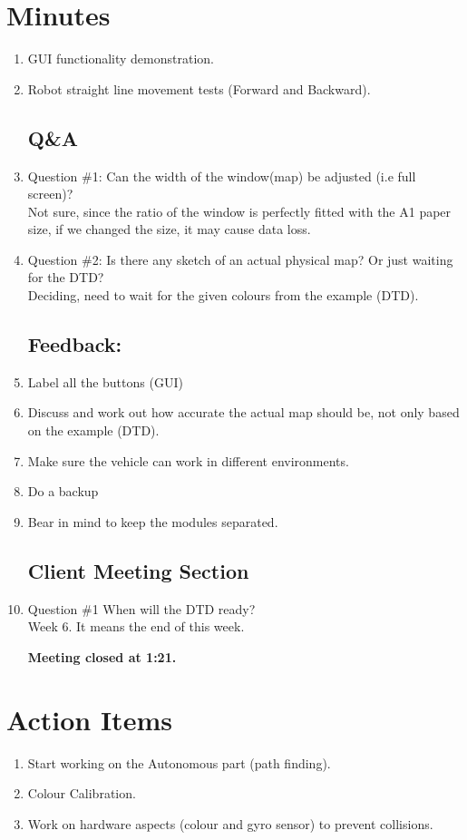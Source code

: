 \documentclass{article}
\begin{document}
\section{Minutes}
\begin{enumerate}
\subsection{GUI Prototype and Basic Movement Presentation}
\item GUI functionality demonstration.\\
\item Robot straight line movement tests (Forward and Backward).\\

\subsection{Q\&A}
\item Question \#1: Can the width of the window(map) be adjusted (i.e full screen)?
\\                  Not sure, since the ratio of the window is perfectly fitted with the A1 paper size, if we changed the size, it may cause data loss.
\item Question \#2: Is there any sketch of an actual physical map? Or just waiting for the DTD?
\\					Deciding, need to wait for the given colours from the example (DTD).

\subsection{Feedback:}

\item Label all the buttons (GUI)
\item Discuss and work out how accurate the actual map should be, not only based on the example (DTD).
\item Make sure the vehicle can work in different environments.
\item Do a backup
\item Bear in mind to keep the modules separated.


\subsection{Client Meeting Section}

\item Question \#1 When will the DTD ready?
\\					Week 6. It means the end of this week.



\vspace{.5cm}
\textbf{Meeting closed at 1:21.}\\
\end{enumerate}

\section{Action Items}
\begin{enumerate}
\item Start working on the Autonomous part (path finding).
\item Colour Calibration.
\item Work on hardware aspects (colour and gyro sensor) to prevent collisions.
\end{enumerate}
\end{document}
